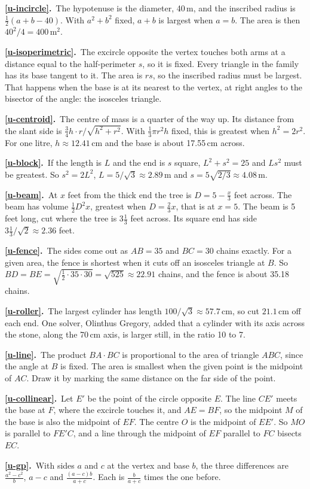 \documentclass[11pt,a4paper]{article}
\newcommand{\ans}[2]{\par\smallskip\noindent\textbf{\ref{#1}.}\ #2}
\begin{document}
\ans{u-incircle}{The hypotenuse is the diameter, 40\,m, and the inscribed radius is
$\tfrac12(a + b - 40)$. With $a^2+b^2$ fixed, $a+b$ is largest when $a = b$. The area is
then $40^2/4 = 400$\,m$^2$.}
\ans{u-isoperimetric}{The excircle opposite the vertex touches both arms at a distance
equal to the half-perimeter $s$, so it is fixed. Every triangle in the family has its base
tangent to it. The area is $rs$, so the inscribed radius must be largest. That happens
when the base is at its nearest to the vertex, at right angles to the bisector of the
angle: the isosceles triangle.}
\ans{u-centroid}{The centre of mass is a quarter of the way up. Its distance from the
slant side is $\tfrac34 h\cdot r/\sqrt{h^2+r^2}$. With $\tfrac13\pi r^2h$ fixed, this is
greatest when $h^2 = 2r^2$. For one litre, $h\approx12.41$\,cm and the base is about
17.55\,cm across.}
\ans{u-block}{If the length is $L$ and the end is $s$ square, $L^2+s^2 = 25$ and $Ls^2$
must be greatest. So $s^2 = 2L^2$, $L = 5/\sqrt3\approx2.89$\,m and $s = 5\sqrt{2/3}
\approx4.08$\,m.}
\ans{u-beam}{At $x$ feet from the thick end the tree is $D = 5 - \tfrac x3$ feet across.
The beam has volume $\tfrac12 D^2x$, greatest when $D = \tfrac23x$, that is at $x = 5$.
The beam is 5 feet long, cut where the tree is $3\tfrac13$ feet across. Its square end
has side $3\tfrac13/\sqrt2\approx2.36$ feet.}
\ans{u-fence}{The sides come out as $AB = 35$ and $BC = 30$ chains exactly. For a given
area, the fence is shortest when it cuts off an isosceles triangle at $B$. So $BD = BE =
\sqrt{\tfrac12\cdot35\cdot30} = \sqrt{525}\approx22.91$ chains, and the fence is about
35.18 chains.}
\ans{u-roller}{The largest cylinder has length $100/\sqrt3\approx57.7$\,cm, so cut
$21.1$\,cm off each end. One solver, Olinthus Gregory, added that a cylinder with its axis
across the stone, along the 70\,cm axis, is larger still, in the ratio 10 to 7.}
\ans{u-line}{The product $BA\cdot BC$ is proportional to the area of triangle $ABC$,
since the angle at $B$ is fixed. The area is smallest when the given point is the
midpoint of $AC$. Draw it by marking the same distance on the far side of the point.}
\ans{u-collinear}{Let $E'$ be the point of the circle opposite $E$. The line $CE'$ meets
the base at $F$, where the excircle touches it, and $AE = BF$, so the midpoint $M$ of the
base is also the midpoint of $EF$. The centre $O$ is the midpoint of $EE'$. So $MO$ is
parallel to $FE'C$, and a line through the midpoint of $EF$ parallel to $FC$ bisects
$EC$.}
\ans{u-gp}{With sides $a$ and $c$ at the vertex and base $b$, the three differences are
$\tfrac{a^2-c^2}{b}$, $a-c$ and $\tfrac{(a-c)b}{a+c}$. Each is $\tfrac{b}{a+c}$ times the
one before.}
\end{document}
